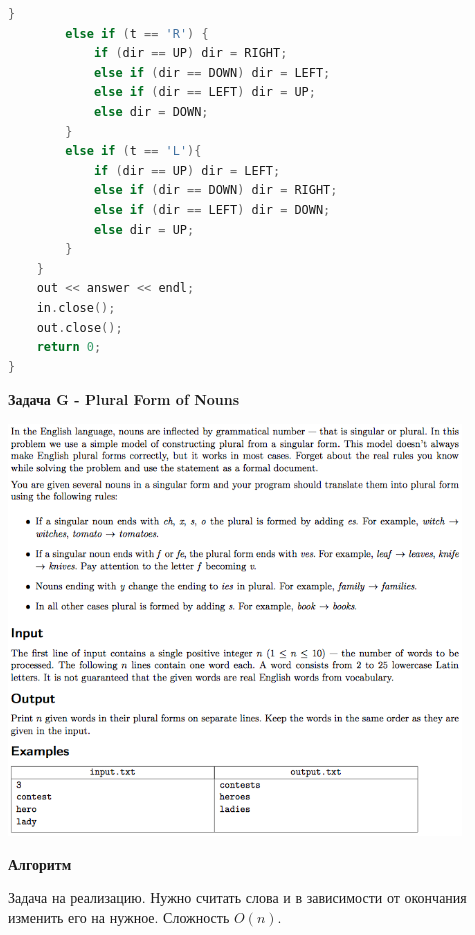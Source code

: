 \documentclass[a4paper,12pt]{article}
\begin{document}
\begin{lstlisting}[language=C]
        }
        else if (t == 'R') {
            if (dir == UP) dir = RIGHT;
            else if (dir == DOWN) dir = LEFT;
            else if (dir == LEFT) dir = UP;
            else dir = DOWN;
        }
        else if (t == 'L'){
            if (dir == UP) dir = LEFT;
            else if (dir == DOWN) dir = RIGHT;
            else if (dir == LEFT) dir = DOWN;
            else dir = UP;
        }
    }
    out << answer << endl;
    in.close();
    out.close();
    return 0;
}
\end{lstlisting}


\newpage
\textbf{{\large Задача G - Plural Form of Nouns}}

\begin{center}
\includegraphics[width=0.9\textwidth]{CT_S02E05/CT_S02E05_G.png}\\ [1cm]
\end{center}

\textbf{{\large Алгоритм}}

Задача на реализацию. Нужно считать слова и в зависимости от окончания изменить его на нужное. Сложность $O(n)$.
\end{document}
